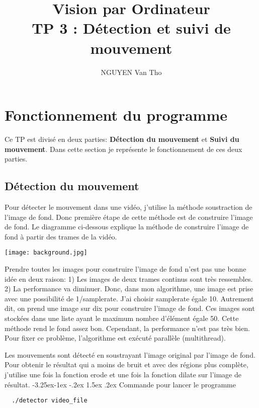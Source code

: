 \documentclass[french,12pt,a4paper,oneside,notitlepage]{report}
\makeatletter
\let\LaTeX@startsection\@startsection
\renewcommand{\@startsection}[6]{\LaTeX@startsection%
{#1}{#2}{#3}{#4}{#5}{\color{bl}\raggedright #6}}
\renewcommand\paragraph{\@startsection{paragraph}{4}{\z@}%
  {-3.25ex\@plus -1ex \@minus -.2ex}%
  {1.5ex \@plus .2ex}%
  {\normalfont\normalsize\bfseries}}
\newcommand\yourName{NGUYEN Van Tho}
\newcommand\yourTitle{\Huge Vision par Ordinateur\\ \Large TP 3 : Détection et suivi de 
mouvement
}
\makeatother
\begin{document}
\author{\yourName}
\title{\yourTitle}
\maketitle
\section{Fonctionnement du programme}
Ce TP est divisé en deux parties: \textbf{Détection du mouvement} et \textbf{Suivi du 
mouvement}. Dans cette section je représente le fonctionnement de ces deux parties. 
\subsection{Détection du mouvement}
Pour détecter le mouvement dans une vidéo, j'utilise la méthode soustraction de l'image 
de fond. Donc première étape de cette méthode est de construire l'image de fond. Le 
diagramme ci-dessous explique la méthode de construire l'image de fond à partir des 
trames de la vidéo.

\begin{center}
\texttt{[image: background.jpg]}
\end{center}

Prendre toutes les images pour construire l'image de fond n'est pas une bonne idée en 
deux raison: 1) Les images de deux trames continus sont très ressembles. 2) La 
performance va diminuer. Donc, dans mon algorithme, une image est prise avec une 
possibilité de 1/samplerate. J'ai choisir samplerate égale 10. Autrement dit, on prend 
une image sur dix pour construire l'image de fond. Ces images sont stockées dans une 
liste ayant le maximum nombre d'élément égale 50.
Cette méthode rend le fond assez bon. Cependant, la performance n'est pas très bien. Pour 
fixer ce problème, l'algorithme est exécuté parallèle (multithread).

Les mouvements sont détecté en soustrayant l'image original par l'image de fond.
Pour obtenir le résultat qui a moins de bruit et avec des régions plus complète, 
j'utilise une fois la fonction erode et une fois la fonction dilate sur l'image de 
résultat.
\paragraph{Commande pour lancer le programme}
\begin{lstlisting}
  ./detector video_file 
\end{lstlisting}
\end{document}

